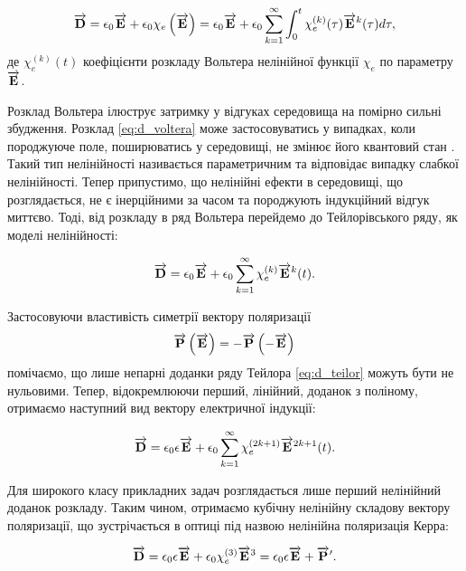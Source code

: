 \begin{equation} \label{eq:d_voltera}
\overrightarrow{\mathbf D} = \epsilon_0 \overrightarrow{\mathbf E} + \epsilon_0 \chi_e \left( \overrightarrow{\mathbf E} \right) = 
\epsilon_0 \overrightarrow{\mathbf E} + \epsilon_0 \sum_{k=1}^{\infty} \int_0^t
\chi_e^{(k)} (\tau) \overrightarrow{\mathbf E}^k (\tau) d \tau,
\end{equation}
%
де $\chi_e^{(k)} (t) $ коефіцієнти розкладу Вольтера нелінійної функції 
$ \chi_e $ по параметру $ \overrightarrow{\mathbf E} $.

Розклад Вольтера ілюструє затримку у відгуках середовища на помірно сильні 
збудження. Розклад \eqref{eq:d_voltera} може застосовуватись у випадках,
коли породжуюче поле, поширюватись у середовищі, не змінює його квантовий
стан \cite{imp:Smirnov2012}. Такий тип нелінійності називається 
параметричним та відповідає випадку слабкої нелінійності. Тепер припустимо, 
що нелінійні ефекти в середовищі, що розглядається, не є інерційними за часом 
та породжують індукційний відгук миттєво. Тоді, від розкладу в ряд Вольтера 
перейдемо до Тейлорівського ряду, як моделі нелінійності:

\begin{equation} \label{eq:d_teilor}
\overrightarrow{\mathbf D} = \epsilon_0 \overrightarrow{\mathbf E} + 
\epsilon_0 \sum_{k=1}^{\infty} \chi_e^{(k)} \overrightarrow{\mathbf E}^k (t).
\end{equation}

Застосовуючи властивість симетрії вектору поляризації 
%
\begin{equation}
\overrightarrow{\mathbf P} \left( \overrightarrow{\mathbf E} \right) = - \overrightarrow{\mathbf P} \left( - \overrightarrow{\mathbf E} \right)
\end{equation}
%
помічаємо, що лише непарні доданки ряду Тейлора \eqref{eq:d_teilor} можуть 
бути не нульовими. Тепер, відокремлюючи перший, лінійний, доданок з 
поліному, отримаємо наступний вид вектору електричної індукції:

\begin{equation} \label{eq:d_teilor_odd}
\overrightarrow{\mathbf D} = \epsilon_0 \epsilon \overrightarrow{\mathbf E} + 
\epsilon_0 \sum_{k=1}^{\infty} \chi_e^{(2k+1)} \overrightarrow{\mathbf E}^{2k+1} (t).
\end{equation}

Для широкого класу прикладних задач розглядається
лише перший нелінійний доданок розкладу. Таким чином, отримаємо кубічну 
нелінійну складову вектору поляризації, що зустрічається в оптиці під 
назвою нелінійна поляризація Керра:

\begin{equation} \label{eq:d_kerr}
\overrightarrow{\mathbf D} = 
\epsilon_0 \epsilon \overrightarrow{\mathbf E} + \epsilon_0 \chi_e^{(3)} \overrightarrow{\mathbf E}^{3} = 
\epsilon_0 \epsilon \overrightarrow{\mathbf E} + \overrightarrow{\mathbf P}^\prime.
\end{equation}

